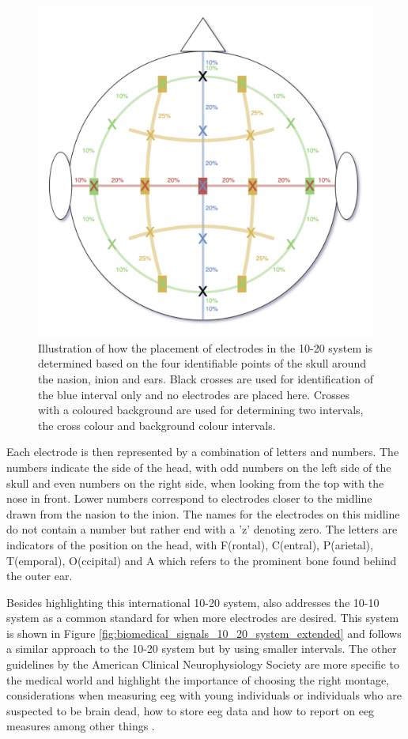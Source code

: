 \begin{figure}[ht]
    \centering
    \includegraphics[width=0.7\linewidth]{../images/biosignals/10-20_system_placement.pdf}
    \captionsetup{width=0.9\linewidth}
    \captionsetup{justification=centering}
    \caption{Illustration of how the placement of electrodes in the 10-20 system is determined based on the four identifiable points of the skull around the nasion, inion and ears. Black crosses are used for identification of the blue interval only and no electrodes are placed here. Crosses with a coloured background are used for determining two intervals, the cross colour and background colour intervals.} 
    \label{fig:biomedical_signals_10_20_system_placement}
\end{figure}

Each electrode is then represented by a combination of letters and numbers.
The numbers indicate the side of the head, with odd numbers on the left side of the skull and even numbers on the right side, when looking from the top with the nose in front.
Lower numbers correspond to electrodes closer to the midline drawn from the nasion to the inion.
The names for the electrodes on this midline do not contain a number but rather end with a 'z' denoting zero.
The letters are indicators of the position on the head, with F(rontal), C(entral), P(arietal), T(emporal), O(ccipital) and A which refers to the prominent bone found behind the outer ear.

Besides highlighting this international 10-20 system, \citet{eeg_guidelines2} also addresses the 10-10 system as a common standard for when more electrodes are desired. 
This system is shown in Figure \ref{fig:biomedical_signals_10_20_system_extended} and follows a similar approach to the 10-20 system but by using smaller intervals.
The other guidelines by the American Clinical Neurophysiology Society are more specific to the medical world and highlight the importance of choosing the right montage, considerations when measuring \gls{eeg} with young individuals or individuals who are suspected to be brain dead, how to store \gls{eeg} data and how to report on \gls{eeg} measures among other things \citep{eeg_guidelines3, eeg_guidelines4, eeg_guidelines5, eeg_guidelines6, eeg_guidelines7}.


